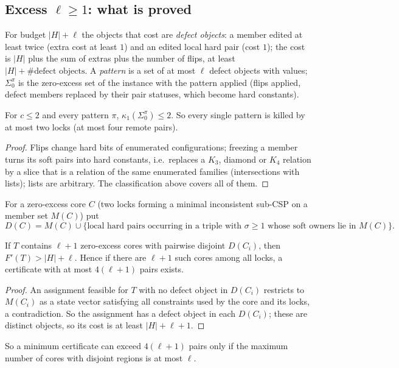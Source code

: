 \subsection{Excess \texorpdfstring{$\ell\ge1$}{l>=1}: what is proved}
For budget $|H|+\ell$ the objects that cost are \emph{defect objects}: a member edited at least twice (extra cost at least $1$) and an edited local hard pair (cost $1$); the cost is $|H|$ plus the sum of extras plus the number of flips, at least $|H|+\#\text{defect objects}$. A \emph{pattern} is a set of at most $\ell$ defect objects with values; $\Sigma_0^\pi$ is the zero-excess set of the instance with the pattern applied (flips applied, defect members replaced by their pair statuses, which become hard constants).
\begin{lemma}\label{lem:mcP}
For $c\le2$ and every pattern $\pi$, $\kappa_1(\Sigma_0^\pi)\le2$. So every single pattern is killed by at most two locks (at most four remote pairs).
\end{lemma}
\begin{proof}
Flips change hard bits of enumerated configurations; freezing a member turns its soft pairs into hard constants, i.e.\ replaces a $K_3$, diamond or $K_4$ relation by a slice that is a relation of the same enumerated families (intersections with lists); lists are arbitrary. The classification above covers all of them.
\end{proof}
For a zero-excess core $C$ (two locks forming a minimal inconsistent sub-CSP on a member set $M(C)$) put
\[D(C)=M(C)\cup\{\text{local hard pairs occurring in a triple with }\sigma\ge1\text{ whose soft owners lie in }M(C)\}.\]
\begin{lemma}\label{lem:mcD}
If $T$ contains $\ell+1$ zero-excess cores with pairwise disjoint $D(C_i)$, then $F'(T)>|H|+\ell$. Hence if there are $\ell+1$ such cores among all locks, a certificate with at most $4(\ell+1)$ pairs exists.
\end{lemma}
\begin{proof}
An assignment feasible for $T$ with no defect object in $D(C_i)$ restricts to $M(C_i)$ as a state vector satisfying all constraints used by the core and its locks, a contradiction. So the assignment has a defect object in each $D(C_i)$; these are distinct objects, so its cost is at least $|H|+\ell+1$.
\end{proof}
So a minimum certificate can exceed $4(\ell+1)$ pairs only if the maximum number of cores with disjoint regions is at most $\ell$.

